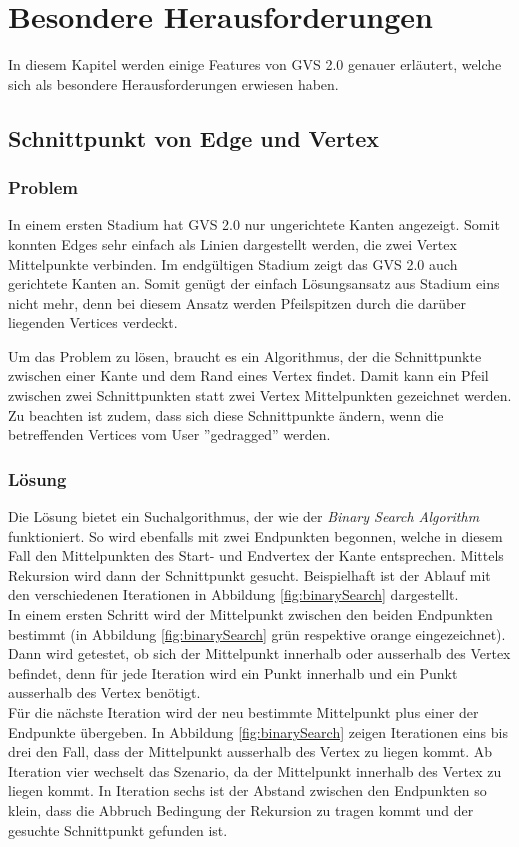 \documentclass[11pt,a4paper,english,oneside]{book}
\numberwithin{equation}{chapter}
\begin{document}
	\section{Besondere Herausforderungen}
	In diesem Kapitel werden einige Features von GVS 2.0 genauer erläutert, welche sich als besondere Herausforderungen erwiesen haben.
	
	\subsection{Schnittpunkt von Edge und Vertex}
	\subsubsection{Problem}
	In einem ersten Stadium hat GVS 2.0 nur ungerichtete Kanten angezeigt. Somit konnten Edges sehr einfach als Linien dargestellt werden, die zwei Vertex Mittelpunkte verbinden. Im endgültigen Stadium zeigt das GVS 2.0 auch gerichtete Kanten an. Somit genügt der einfach Lösungsansatz aus Stadium eins nicht mehr, denn bei diesem Ansatz werden Pfeilspitzen durch die darüber liegenden Vertices verdeckt.
	
	Um das Problem zu lösen, braucht es ein Algorithmus, der die Schnittpunkte zwischen einer Kante und dem Rand eines Vertex findet. Damit kann ein Pfeil zwischen zwei Schnittpunkten statt zwei Vertex Mittelpunkten gezeichnet werden. Zu beachten ist zudem, dass sich diese Schnittpunkte ändern, wenn die betreffenden Vertices vom User ''gedragged'' werden.
	
	\subsubsection{Lösung}
	Die Lösung bietet ein Suchalgorithmus, der wie der \textit{Binary Search Algorithm} \cite{adbook} funktioniert. So wird ebenfalls mit zwei Endpunkten begonnen, welche in diesem Fall den Mittelpunkten des Start- und Endvertex der Kante entsprechen. Mittels Rekursion wird dann der Schnittpunkt gesucht. Beispielhaft ist der Ablauf mit den verschiedenen Iterationen in Abbildung \ref{fig:binarySearch} dargestellt. \\
	In einem ersten Schritt wird der Mittelpunkt zwischen den beiden Endpunkten bestimmt (in Abbildung  \ref{fig:binarySearch} grün respektive orange eingezeichnet). Dann wird getestet, ob sich der Mittelpunkt innerhalb oder ausserhalb des Vertex befindet, denn für jede Iteration wird ein Punkt innerhalb und ein Punkt ausserhalb des Vertex benötigt. \\
	Für die nächste Iteration wird der neu bestimmte Mittelpunkt plus einer der Endpunkte übergeben. In Abbildung  \ref{fig:binarySearch} zeigen Iterationen eins bis drei den Fall, dass der Mittelpunkt ausserhalb des Vertex zu liegen kommt. Ab Iteration vier wechselt das Szenario, da der Mittelpunkt innerhalb des Vertex zu liegen kommt. In Iteration sechs ist der Abstand zwischen den Endpunkten so klein, dass die Abbruch Bedingung der Rekursion zu tragen kommt und der gesuchte Schnittpunkt gefunden ist. \\
	
\end{document}
